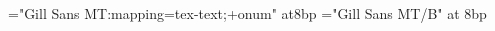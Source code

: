 \documentclass[11pt,article,oneside,oldfontcommands]{memoir}
\begin{document}
\smallskip 


\begin{center}

\begin{minipage*}{15cm} %

\begin{Spacing}{0.7}

\def\mainfont{Gill Sans MT}
\font\bodyfont="\mainfont:mapping=tex-text;+onum" at8bp \let\tenrm\bodyfont
\font\boldfont="\mainfont/B" at 8bp \let\tenbf\boldfont
\bodyfont



\def\arraystretch{1}%
    \begin{tabular}{ p{0.5cm} p{0.5cm} L{1.5cm} L{4cm} R{1.5cm}  R{1cm}  R{1cm}  R{1cm}  }
  

\end{tabular}
\end{Spacing}
\end{minipage*}
\end{center}
\end{document}
